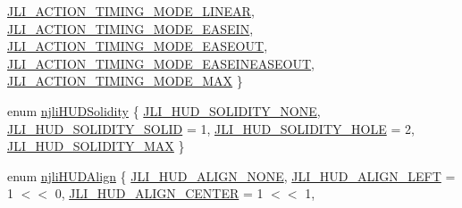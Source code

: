 \begin{DoxyCompactItemize}
\mbox{\hyperlink{namespacenjli_affc383078a5935be1509062828a1824baa92e26f10321c835d6ea436a5fa0264e}{J\+L\+I\+\_\+\+A\+C\+T\+I\+O\+N\+\_\+\+T\+I\+M\+I\+N\+G\+\_\+\+M\+O\+D\+E\+\_\+\+L\+I\+N\+E\+AR}}, 
\mbox{\hyperlink{namespacenjli_affc383078a5935be1509062828a1824ba08be3eb3f43ae177aa8fd4b34e2407ee}{J\+L\+I\+\_\+\+A\+C\+T\+I\+O\+N\+\_\+\+T\+I\+M\+I\+N\+G\+\_\+\+M\+O\+D\+E\+\_\+\+E\+A\+S\+E\+IN}}, 
\mbox{\hyperlink{namespacenjli_affc383078a5935be1509062828a1824bacce80ae1388691ac76b7dc4949c9f51a}{J\+L\+I\+\_\+\+A\+C\+T\+I\+O\+N\+\_\+\+T\+I\+M\+I\+N\+G\+\_\+\+M\+O\+D\+E\+\_\+\+E\+A\+S\+E\+O\+UT}}, 
\newline
\mbox{\hyperlink{namespacenjli_affc383078a5935be1509062828a1824ba6676cf1fcd9e34bd15ba1964f4272bd6}{J\+L\+I\+\_\+\+A\+C\+T\+I\+O\+N\+\_\+\+T\+I\+M\+I\+N\+G\+\_\+\+M\+O\+D\+E\+\_\+\+E\+A\+S\+E\+I\+N\+E\+A\+S\+E\+O\+UT}}, 
\mbox{\hyperlink{namespacenjli_affc383078a5935be1509062828a1824badb523c2202cc055b57f6d532b99ddfa0}{J\+L\+I\+\_\+\+A\+C\+T\+I\+O\+N\+\_\+\+T\+I\+M\+I\+N\+G\+\_\+\+M\+O\+D\+E\+\_\+\+M\+AX}}
 \}
\item 
enum \mbox{\hyperlink{namespacenjli_adcb6d335a391e792ea49e55a2b394168}{njli\+H\+U\+D\+Solidity}} \{ \mbox{\hyperlink{namespacenjli_adcb6d335a391e792ea49e55a2b394168aeb5dc4f5a237799007ff5bdd20f67bc8}{J\+L\+I\+\_\+\+H\+U\+D\+\_\+\+S\+O\+L\+I\+D\+I\+T\+Y\+\_\+\+N\+O\+NE}}, 
\mbox{\hyperlink{namespacenjli_adcb6d335a391e792ea49e55a2b394168acdbd067f1e3199418e7885a29809b615}{J\+L\+I\+\_\+\+H\+U\+D\+\_\+\+S\+O\+L\+I\+D\+I\+T\+Y\+\_\+\+S\+O\+L\+ID}} = 1, 
\mbox{\hyperlink{namespacenjli_adcb6d335a391e792ea49e55a2b394168a34496e0246306fde58f04dfdb06e4b07}{J\+L\+I\+\_\+\+H\+U\+D\+\_\+\+S\+O\+L\+I\+D\+I\+T\+Y\+\_\+\+H\+O\+LE}} = 2, 
\mbox{\hyperlink{namespacenjli_adcb6d335a391e792ea49e55a2b394168ac14fdd6428c153de3bc72c7d87cac7f9}{J\+L\+I\+\_\+\+H\+U\+D\+\_\+\+S\+O\+L\+I\+D\+I\+T\+Y\+\_\+\+M\+AX}}
 \}
\item 
enum \mbox{\hyperlink{namespacenjli_a376c3102aef4710f2b54a545bf0e2b3a}{njli\+H\+U\+D\+Align}} \{ \newline
\mbox{\hyperlink{namespacenjli_a376c3102aef4710f2b54a545bf0e2b3aa02251518523afeae7e2518357c9ed740}{J\+L\+I\+\_\+\+H\+U\+D\+\_\+\+A\+L\+I\+G\+N\+\_\+\+N\+O\+NE}}, 
\mbox{\hyperlink{namespacenjli_a376c3102aef4710f2b54a545bf0e2b3aabca0f32318ac2d51572301aec394e197}{J\+L\+I\+\_\+\+H\+U\+D\+\_\+\+A\+L\+I\+G\+N\+\_\+\+L\+E\+FT}} = 1 $<$$<$ 0, 
\mbox{\hyperlink{namespacenjli_a376c3102aef4710f2b54a545bf0e2b3aa7d908bb153a34beba1f7bee78c0eb816}{J\+L\+I\+\_\+\+H\+U\+D\+\_\+\+A\+L\+I\+G\+N\+\_\+\+C\+E\+N\+T\+ER}} = 1 $<$$<$ 1, 

\end{DoxyCompactItemize}
